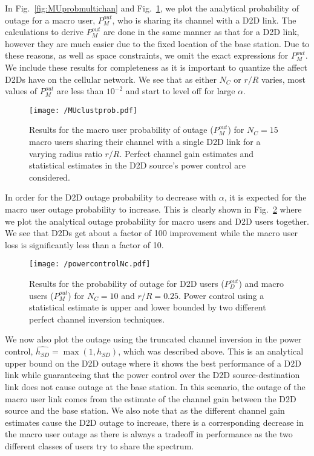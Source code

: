 \documentclass[10pt, final, journal, letterpaper,oneside, twocolumn]{IEEEtran}
\begin{document}
In Fig.~\ref{fig:MUprobmultichan} and Fig.~\ref{fig:MUclustprob}, we plot the analytical probability of outage for a macro user, $P_M^{out}$, who is sharing its channel with a D2D link.  The calculations to derive $P_M^{out}$ are done in the same manner as that for a D2D link, however they are much easier due to the fixed location of the base station.  Due to these reasons, as well as space constraints, we omit the exact expressions for $P_M^{out}$.  We include these results for completeness as it is important to quantize the affect D2Ds have on the cellular network.  We see that as either $N_C$ or $r/R$ varies, most values of $P_M^{out}$ are less than $10^{-2}$ and start to level off for large $\alpha$.  
\begin{figure}[htp]
\center
 \texttt{[image: /MUclustprob.pdf]}
  \caption[]{Results for the macro user probability of outage ($P^{out}_{M}$) for $N_C = 15$ macro users sharing their channel with a single D2D link for a varying radius ratio $r/R$. Perfect channel gain estimates and statistical estimates in the D2D source's power control are considered. }
  \label{fig:MUclustprob}
\end{figure}
In order for the D2D outage probability to decrease with $\alpha$, it is expected for the macro user outage probability to increase.  This is clearly shown in Fig.~\ref{fig:truncatedPC} where we plot the analytical outage probability for macro users and D2D users together.  We see that D2Ds get about a factor of 100 improvement while the macro user loss is significantly less than a factor of 10.  
\begin{figure}[htp]
\center
 \texttt{[image: /powercontrolNc.pdf]}
  \caption[]{Results for the probability of outage for D2D users ($P_{D}^{out}$) and macro users ($P_{M}^{out}$) for $N_C=10$ and $r/R=0.25$.  Power control using a statistical estimate is upper and lower bounded by two different perfect channel inversion techniques. }
  \label{fig:truncatedPC}
\end{figure}
We now also plot the outage using the truncated channel inversion in the power control, $\widehat{h_{SD}}=\max(1,h_{SD})$, which was described above.  This is an analytical upper bound on the D2D outage where it shows the best performance of a D2D link while guaranteeing that the power control over the D2D source-destination link does not cause outage at the base station.  In this scenario, the outage of the macro user link comes from the estimate of the channel gain between the D2D source and the base station.  We also note that as the different channel gain estimates cause the D2D outage to increase, there is a corresponding decrease in the macro user outage as there is always a tradeoff in performance as the two different classes of users try to share the spectrum.  
\end{document}

